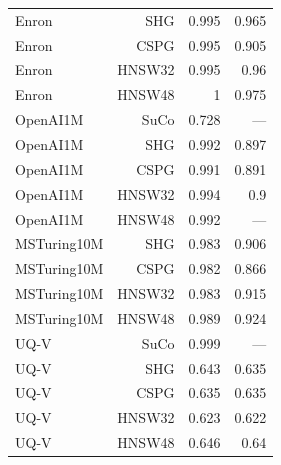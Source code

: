 \begin{table}[t]
\begin{tabular}{lrrr}
Enron & SHG & 0.995 & 0.965 \\
Enron & CSPG & 0.995 & 0.905 \\
Enron & HNSW32 & 0.995 & 0.96 \\
Enron & HNSW48 & 1 & 0.975 \\
OpenAI1M & SuCo & 0.728 & — \\
OpenAI1M & SHG & 0.992 & 0.897 \\
OpenAI1M & CSPG & 0.991 & 0.891 \\
OpenAI1M & HNSW32 & 0.994 & 0.9 \\
OpenAI1M & HNSW48 & 0.992 & — \\
MSTuring10M & SHG & 0.983 & 0.906 \\
MSTuring10M & CSPG & 0.982 & 0.866 \\
MSTuring10M & HNSW32 & 0.983 & 0.915 \\
MSTuring10M & HNSW48 & 0.989 & 0.924 \\
UQ-V & SuCo & 0.999 & — \\
UQ-V & SHG & 0.643 & 0.635 \\
UQ-V & CSPG & 0.635 & 0.635 \\
UQ-V & HNSW32 & 0.623 & 0.622 \\
UQ-V & HNSW48 & 0.646 & 0.64 \\
\bottomrule
\end{tabular}
\end{table}
